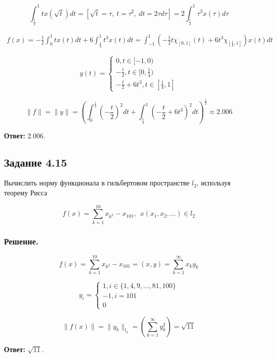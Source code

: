 \documentclass[a4paper, 12pt]{report}
\begin{document}
\begin{equation*}
\int_{\frac{1}{2}}^{1} tx(\sqrt{t})dt = 
\left[ \sqrt{t} = \tau,\  t = \tau^2,\ dt = 2\tau d \tau \right] = 
2 \int_{\frac{1}{4}}^{1} \tau^3 x(\tau) d \tau
\end{equation*}

\begin{multline*}
f(x) = - \frac{1}{2} \int_{0}^{1} t x(t) dt + 6 \int_{\frac{1}{4}}^{1} t^3 x(t) dt =
\int_{ - 1}^{1} \left( - \frac{1}{2} t \chi_{[0, 1]} (t) + 6 t^3 \chi_{[\frac{1}{4}, 1]} \right) x(t) dt
\end{multline*}

\begin{equation*}
  y(t) = 
  \begin{cases}
    0, t \in [ - 1, 0)\\
    - \frac{t}{2}, t \in [0, \frac{1}{4})\\
    - \frac{t}{2} + 6 t^3, t\in [\frac{1}{4}, 1]
  \end{cases}
\end{equation*}

\begin{equation*}
  \| f \| = \| y \| = \left( \int_{0}^{\frac{1}{4}} \left( - \frac{t}{2} \right)^2 dt +
  \int_{\frac{1}{4}}^{1} \left( - \frac{t}{2} + 6 t^3\right)^2 dt \right)^\frac{1}{2}
  \approx 2.006
\end{equation*}

\textbf{Ответ:} 2.006.
\newpage
\subsection*{Задание 4.15}

Вычислить норму функционала в гильбертовом пространстве $l_2$, используя теорему
Рисса

\[f(x) = \sum_{k=1}^{10} x_{k^2} - x_{101},\ \ x(x_1, x_2, \dots ) \in l_2\]

\subsubsection*{Решение.}

\[f(x) = \sum_{k=1}^{10} x_{k^2} - x_{101} = (x, y) = \sum_{k = 1}^{\infty} x_k y_k \]

\begin{equation*}
  y_i = 
  \begin{cases}
    1, i \in \{1, 4, 9, \dots , 81, 100\}\\
    - 1, i = 101\\
    0
  \end{cases}
\end{equation*}

\[\| f(x) \| = \| y_k \|_{l_2} = \left( \sum_{k = 1}^{\infty} y_k^2 \right) = \sqrt{11}\]

\textbf{Ответ: } $\sqrt{11}$.
\end{document}
